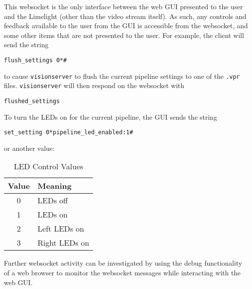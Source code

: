 \documentclass{article}
\begin{document}
This websocket is the only interface between the web GUI presented to the user and the Limelight (other than the video stream itself). As such, any controls and feedback available to the user from the GUI is accessible from the websocket, and some other items that are not presented to the user. For example, the client will send the string
\begin{verbatim}
flush_settings 0*#
\end{verbatim} 
to cause \texttt{visionserver} to flush the current pipeline settings to one of the \texttt{.vpr} files. \texttt{visionserver} will then respond on the websocket with 
\begin{verbatim}
flushed_settings
\end{verbatim}
To turn the LEDs on for the current pipeline, the GUI sends the string
\begin{verbatim}
set_setting 0*pipeline_led_enabled:1#
\end{verbatim}
or another value:
\begin{table}[H]
	\centering
	\begin{tabular}{|c|l|}
		\hline
		\textbf{Value} & \textbf{Meaning}\\ \hline
		0 & LEDs off \\ \hline
		1 & LEDs on \\ \hline
		2 & Left LEDs on \\ \hline
		3 & Right LEDs on \\ \hline
	\end{tabular}
    \caption{LED Control Values}
    \label{tab:led}
\end{table}
\par Further websocket activity can be investigated by using the debug functionality of a web browser to monitor the websocket messages while interacting with the web GUI. 
\end{document}
